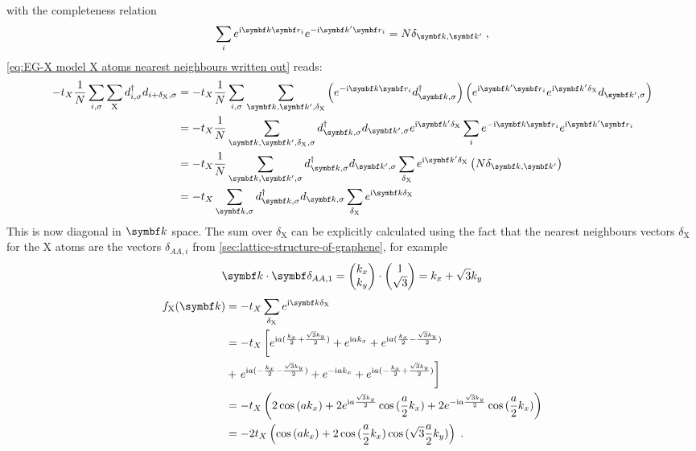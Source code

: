 \documentclass[../notes.tex]{subfiles}
\begin{document}
with the completeness relation
\begin{equation}
	\sum_{i} e^{\iu \vb{k} \vb{r}_{i}} e^{-\iu \vb{k}^{\prime} \vb{r}_{i}} = N \delta_{\vb{k}, \vb{k}^{\prime}}\;,
\end{equation}
\cref{eq:EG-X model X atoms nearest neighbours written out} reads:
\begin{align}
	-t_X \frac{1}{N} \sum_{i, \sigma} \sum_{\mathrm{X}} d_{i, \sigma}^{\dagger} d_{i + \delta_{\mathrm{X}}, \sigma}
	&= -t_X \frac{1}{N} \sum_{i,\sigma} \sum_{\vb{k}, \vb{k}^{\prime}, \delta_{\mathrm{X}}} \left(e^{-\iu \vb{k} \vb{r}_i} d_{\vb{k}, \sigma}^{\dagger} \right) \left(e^{\iu \vb{k}^{\prime} \vb{r}_i} e^{\iu \vb{k}^{\prime} \delta_{\mathrm{X}}} d_{\vb{k}^{\prime}, \sigma} \right) \\
	&= -t_X \frac{1}{N} \sum_{\vb{k}, \vb{k^{\prime}}, \delta_{\mathrm{X}}, \sigma} d_{\vb{k}, \sigma}^{\dagger}   d_{\vb{k}^{\prime}, \sigma} e^{\iu \vb{k}^{\prime} \delta_{\mathrm{X}}} \sum_{i} e^{-\iu \vb{k} \vb{r}_i} e^{\iu \vb{k}^{\prime} \vb{r}_i} \\
	&= -t_X \frac{1}{N} \sum_{\vb{k}, \vb{k^{\prime}}, \sigma}  d_{\vb{k}, \sigma}^{\dagger}  d_{\vb{k}^{\prime}, \sigma} \sum_{\delta_{\mathrm{X}}} e^{\iu \vb{k}^{\prime} \delta_{\mathrm{X}}} \left(N \delta_{\vb{k}, \vb{k}^{\prime}} \right)\\
	&= -t_X \sum_{\vb{k}, \sigma}  d_{\vb{k}, \sigma}^{\dagger}d_{\vb{k}, \sigma} \sum_{\delta_{\mathrm{X}}} e^{\iu \vb{k} \delta_{\mathrm{X}}}
\end{align}
This is now diagonal in \(\vb{k}\) space.
The sum over \(\delta_{\mathrm{X}}\) can be explicitly calculated using the fact that the nearest neighbours vectors \(\delta_{\mathrm{X}}\) for the \(\mathrm{X}\) atoms are the vectors \(\delta_{AA, i}\) from \cref{sec:lattice-structure-of-graphene}, for example
\begin{align}
	\vb{k} \cdot \vb{\delta_{AA, 1}} = \begin{pmatrix} k_x \\ k_y \end{pmatrix} \cdot \begin{pmatrix} 1 \\ \sqrt{3} \end{pmatrix} = k_x + \sqrt{3} k_y
\end{align}
\begin{align}
	f_{\mathrm{X}} (\vb{k}) &= -t_X \sum_{\delta_{\mathrm{X}}} e^{\iu \vb{k} \delta_{\mathrm{X}}} \\
	&= -t_X \left[ e^{\iu a (\frac{k_x}{2} + \frac{\sqrt{3} k_y}{2})}
	+ e^{\iu a k_x}
	+ e^{\iu a (\frac{k_x}{2} - \frac{\sqrt{3} k_y}{2})}
	\right. \\
	&+ \left. e^{\iu a (-\frac{k_x}{2} - \frac{\sqrt{3} k_y}{2})}
	+ e^{-\iu a k_x}
	+ e^{\iu a (-\frac{k_x}{2} + \frac{\sqrt{3} k_y}{2})} \right] \\
	&= -t_X \left( 2 \cos{(a k_x)} + 2 e^{\iu a \frac{\sqrt{3} k_y}{2}} \cos{(\frac{a}{2} k_x)} + 2 e^{-\iu a \frac{\sqrt{3} k_y}{2}} \cos{(\frac{a}{2} k_x)} \right) \\
	&= -2t_X \left( \cos{(a k_x)} + 2 \cos{(\frac{a}{2} k_x)} \cos{(\sqrt{3} \frac{ a}{2} k_y)} \right) \;.
\end{align}
\end{document}
